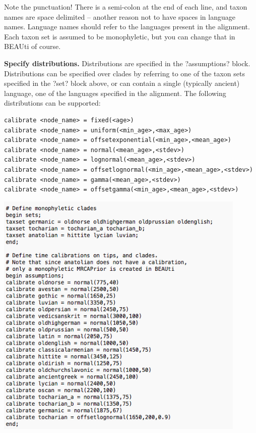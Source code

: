 \documentclass{article}
\begin{document}
Note the punctuation! There is a semi-colon at the end of each line, and taxon names are space delimited -- another reason not to have spaces in language names. Language names should refer to the languages present in the alignment. Each taxon set is assumed to be monophyletic, but you can change that in BEAUti of course.

{\bf Specify distributions.}
Distributions are specified in the ?assumptions? block.
Distributions can be specified over clades by referring to one of the taxon sets specified in the ?set? block above, or can contain a single (typically ancient) language, one of the languages specified in the alignment. The following distributions can be supported:

\begin{verbatim}
calibrate <node_name> = fixed(<age>)
calibrate <node_name> = uniform(<min_age>,<max_age>)
calibrate <node_name> = offsetexponential(<min_age>,<mean_age>)
calibrate <node_name> = normal(<mean_age>,<stdev>)
calibrate <node_name> = lognormal(<mean_age>,<stdev>)
calibrate <node_name> = offsetlognormal(<min_age>,<mean_age>,<stdev>)
calibrate <node_name> = gamma(<mean_age>,<stdev>)
calibrate <node_name> = offsetgamma(<min_age>,<mean_age>,<stdev>)          
\end{verbatim}

\begin{center}
\includegraphics[width=0.9\textwidth]{nexus1}
\end{center}
\end{document}
